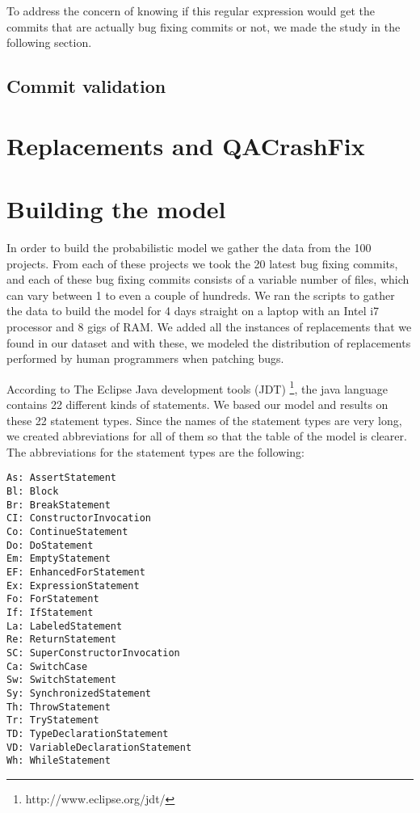 \documentclass{sig-alternate-05-2015}
\begin{document}
To address the concern of knowing if this regular expression would get the commits that are actually bug fixing commits or not, we made the study in the following section.

\subsection{Commit validation}


\section{Replacements and QACrashFix}


\section{Building the model}

In order to build the probabilistic model we gather the data from the 100 projects. From each of these projects we took the 20 latest bug fixing commits, and each of these bug fixing commits consists of a variable number of files, which can vary between 1 to even a couple of hundreds.
We ran the scripts to gather the data to build the model for 4 days straight on a laptop with an Intel i7 processor and 8 gigs of RAM. We added all the instances of replacements that we found in our dataset and with these, we modeled the distribution of replacements performed by human programmers when patching bugs.

According to The Eclipse Java development tools (JDT) \footnote{http://www.eclipse.org/jdt/}, the java language contains 22 different kinds of statements. We based our model and results on these 22 statement types. Since the names of the statement types are very long, we created abbreviations for all of them so that the table of the model is clearer. The abbreviations for the statement types are the following:

\begin{verbatim}
As: AssertStatement
Bl: Block
Br: BreakStatement
CI: ConstructorInvocation
Co: ContinueStatement
Do: DoStatement
Em: EmptyStatement
EF: EnhancedForStatement
Ex: ExpressionStatement
Fo: ForStatement
If: IfStatement
La: LabeledStatement
Re: ReturnStatement
SC: SuperConstructorInvocation
Ca: SwitchCase
Sw: SwitchStatement
Sy: SynchronizedStatement
Th: ThrowStatement
Tr: TryStatement
TD: TypeDeclarationStatement
VD: VariableDeclarationStatement
Wh: WhileStatement
\end{verbatim}
\end{document}
